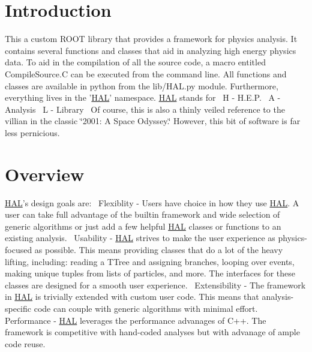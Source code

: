 \hypertarget{index_intro_sec}{}\section{Introduction}\label{index_intro_sec}
This a custom R\+O\+O\+T library that provides a framework for physics analysis. It contains several functions and classes that aid in analyzing high energy physics data. To aid in the compilation of all the source code, a macro entitled {\ttfamily Compile\+Source.\+C} can be executed from the command line. All functions and classes are available in python from the {\ttfamily lib/\+H\+A\+L.\+py} module. Furthermore, everything lives in the '\hyperlink{namespace_h_a_l}{H\+A\+L}' namespace. \hyperlink{namespace_h_a_l}{H\+A\+L} stands for~\newline
H -\/ H.\+E.\+P.~\newline
A -\/ Analysis~\newline
L -\/ Library~\newline
Of course, this is also a thinly veiled reference to the villian in the classic \char`\"{}2001\+: A Space Odyssey.\char`\"{} However, this bit of software is far less pernicious.\hypertarget{index_overview_sec}{}\section{Overview}\label{index_overview_sec}
\hyperlink{namespace_h_a_l}{H\+A\+L}'s design goals are\+:~\newline
Flexiblity -\/ Users have choice in how they use \hyperlink{namespace_h_a_l}{H\+A\+L}. A user can take full advantage of the builtin framework and wide selection of generic algorithms or just add a few helpful \hyperlink{namespace_h_a_l}{H\+A\+L} classes or functions to an existing analysis.~\newline
Usability -\/ \hyperlink{namespace_h_a_l}{H\+A\+L} strives to make the user experience as physics-\/focused as possible. This means providing classes that do a lot of the heavy lifting, including\+: reading a T\+Tree and assigning branches, looping over events, making unique tuples from lists of particles, and more. The interfaces for these classes are designed for a smooth user experience.~\newline
Extensibility -\/ The framework in \hyperlink{namespace_h_a_l}{H\+A\+L} is trivially extended with custom user code. This means that analysis-\/specific code can couple with generic algorithms with minimal effort.~\newline
Performance -\/ \hyperlink{namespace_h_a_l}{H\+A\+L} leverages the performance advanages of C++. The framework is competitive with hand-\/coded analyses but with advanage of ample code reuse.~\newline
